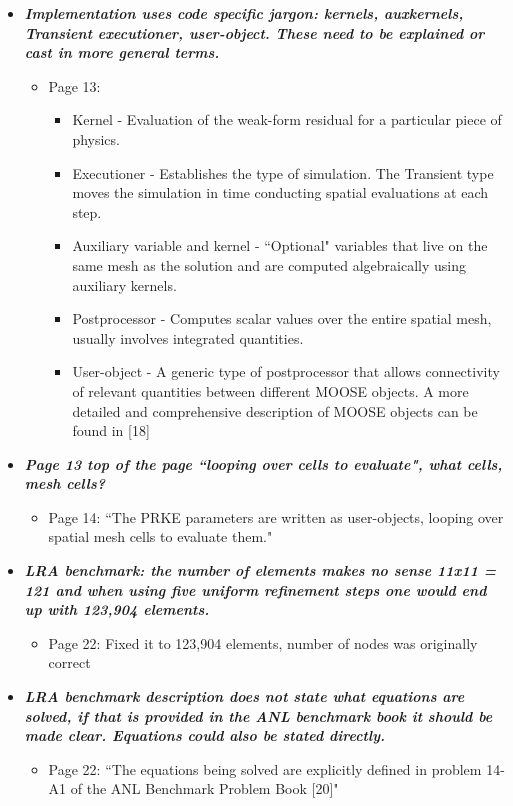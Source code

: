 \documentclass{elsarticle}
\newcommand{\done}{\checkmark}
\newcommand{\easy}[1]{\textbf{\textit{#1}}}
\newcommand{\medm}[1]{\textbf{\textit{#1}}}
\begin{document}
\begin{itemize}
\item[\done] \medm{ Implementation uses code specific jargon: kernels, auxkernels, Transient executioner, user-object. These need to be explained or cast in more general terms. }
\begin{itemize}
\item Page 13:
\begin{itemize}
\item Kernel - Evaluation of the weak-form residual for a particular piece of physics.
\item Executioner - Establishes the type of simulation. The Transient type moves the simulation in time conducting spatial evaluations at each step.
\item Auxiliary variable and kernel - ``Optional" variables that live on the same mesh as the solution and are computed algebraically using auxiliary kernels. 
\item Postprocessor - Computes scalar values over the entire spatial mesh, usually involves integrated quantities.
\item User-object - A generic type of postprocessor that allows connectivity of relevant quantities between different MOOSE objects.
A more detailed and comprehensive description of MOOSE objects can be found in [18]
\end{itemize}
\end{itemize}

\item[\done] \easy{ Page 13 top of the page ``looping over cells to evaluate", what cells, mesh cells? }
\begin{itemize}
\item Page 14: ``The PRKE parameters are written as user-objects, looping over spatial mesh cells to evaluate them."
\end{itemize}

\item[\done] \easy{ LRA benchmark: the number of elements makes no sense 11x11 = 121 and when using five uniform refinement steps one would end up with 123,904 elements. }
\begin{itemize}
\item Page 22: Fixed it to 123,904 elements, number of nodes was originally correct
\end{itemize}

\item[\done] \easy{ LRA benchmark description does not state what equations are solved, if that is provided in the ANL benchmark book it should be made clear. Equations could also be stated directly. }
\begin{itemize}
\item  Page 22: ``The equations being solved are explicitly defined in problem 14-A1 of the ANL Benchmark Problem Book [20]"
\end{itemize}


\end{itemize}
\end{document}
